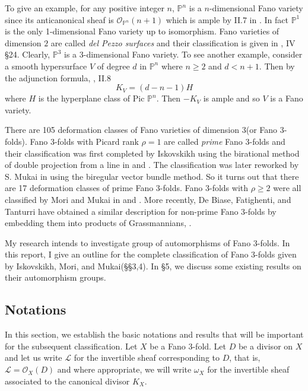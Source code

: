 \documentclass[11pt]{amsart}
\theoremstyle{plain}
\theoremstyle{definition}
\theoremstyle{expl}
\begin{document}
	To give an example, for any positive integer $n$,  $\mathbb{P}^n$ is a $n$-dimensional Fano variety since its anticanonical sheaf is $\mathcal{O}_{\mathbb{P}^n}(n+1)$ which is ample by II.7 in \cite{Hartshorne}. In fact $\mathbb{P}^1$ is the only 1-dimensional Fano variety up to isomorphism. Fano varieties of dimension $2$ are called \textit{del Pezzo surfaces} and their classification is given in \cite{Manin}, IV \S 24. Clearly, $\mathbb{P}^3$ is a $3$-dimensional Fano variety. To see another example, consider a smooth hypersurface $V$ of degree $d$ in $\mathbb{P}^n$ where $n \geq 2$ and $d<n+1$. Then by the adjunction formula, \cite{Hartshorne}, II.8
	\[
	K_V = (d-n-1)H
	\]
    where $H$ is the hyperplane class of Pic $\mathbb{P}^n$. Then $-K_V$ is ample and so $V$ is a Fano variety.
    
 There are 105 deformation classes of Fano varieties of dimension $3$(or Fano $3$-folds). Fano $3$-folds with Picard rank $\rho =1$ are called \textit{prime} Fano $3$-folds and their classification was first completed by Iskovskikh using the birational method of double projection from a line in \cite{Isk77} and \cite{Isk78}. The classification was later reworked by S. Mukai in \cite{Muk89} using the biregular vector bundle method. So it turns out that there are 17 deformation classes of prime Fano $3$-folds. Fano $3$-folds with $\rho\geq 2$ were all classified by Mori and Mukai in \cite{MM81} and \cite{MM03}. More recently, De Biase, Fatighenti, and Tanturri have obtained a similar description for non-prime Fano $3$-folds by embedding them into products of Grassmannians, \cite{Hove}.
 
My research intends to investigate group of automorphisms of Fano $3$-folds. In this report, I give an outline for the complete classification of Fano $3$-folds given by Iskovskikh, Mori, and Mukai(\S\S 3,4). In \S 5, we discuss some existing results on their automorphism groups. 

\subsection{Notations} In this section, we establish the basic notations and results that will be important for the subsequent classification. 
Let $X$ be a Fano $3$-fold. 
Let $D$ be a divisor on $X$ and let us write $\mathcal{L}$ for the invertible sheaf corresponding to $D$, that is, $\mathcal{L} = \mathcal{O}_X(D)$ and where appropriate, we will write $\omega_X$ for the invertible sheaf associated to the canonical divisor $K_X$.
\end{document}
